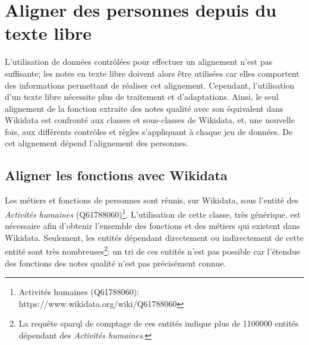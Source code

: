 \section{\label{II-C-3}Aligner des personnes depuis du texte libre}

L'utilisation de données contrôlées pour effectuer un alignement n'est pas suffisante; les notes en texte libre doivent alors être utilisées car elles comportent des informations permettant de réaliser cet alignement. Cependant, l'utilisation d'un texte libre nécessite plus de traitement et d'adaptations. Ainsi, le seul alignement de la fonction extraite des notes qualité avec son équivalent dans Wikidata est confronté aux classes et sous-classes de Wikidata, et, une nouvelle fois, aux différents contrôles et règles s'appliquant à chaque jeu de données. De cet alignement dépend l'alignement des personnes.

\subsection{\label{II-C-3-a}Aligner les fonctions avec Wikidata}

Les métiers et fonctions de personnes sont réunis, sur Wikidata, sous l'entité des \textit{Activités humaines} (Q61788060)\footnote{Activités humaines (Q61788060): https://www.wikidata.org/wiki/Q61788060}. L'utilisation de cette classe, très générique, est nécessaire afin d'obtenir l'ensemble des fonctions et des métiers qui existent dans Wikidata. Seulement, les entités dépendant directement ou indirectement de cette entité sont très nombreuses\footnote{La requête \ac{sparql} de comptage de ces entités indique plus de 1100000 entités dépendant des \textit{Activités humaines}.}: un tri de ces entités n'est pas possible car l'étendue des fonctions des notes qualité n'est pas précisément connue.\\

